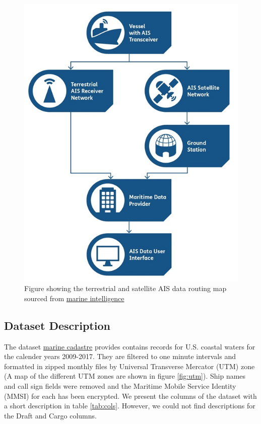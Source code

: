 \documentclass[bsc,frontabs,twoside,singlespacing,parskip,deptreport]{infthesis}     %
\begin{document}
\begin{figure}
    \centering
    \includegraphics[scale=0.8]{report/images/Understanding_AIS_Fig1.jpg}
    \caption{Figure showing the terrestrial and satellite AIS data routing map sourced from \href{https://maritimeintelligence.informa.com/}{marine intelligence} }
    \label{fig:my_label}
\end{figure}

\subsection{Dataset Description}
The dataset \href{https://marinecadastre.gov/ais/}{marine cadastre} provides contains records for U.S. coastal waters for the calender years 2009-2017. They are filtered to one minute intervals and formatted in zipped monthly files by Universal Transverse Mercator (UTM) zone (A map of the different UTM zones are shown in figure \ref{fig:utm}). Ship names and call sign fields were removed and the Maritime Mobile Service Identity (MMSI) for each has been encrypted. We present the columns of the dataset with a short description in table \ref{tab:cols}. However, we could not find descriptions for the Draft and Cargo columns.
\end{document}
